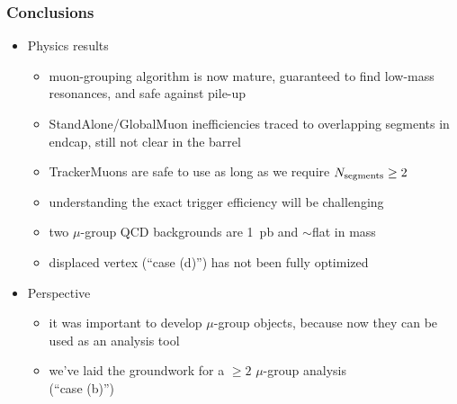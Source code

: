 \documentclass[compress]{beamer}
\newcommand{\s}[1]{{\mbox{\scriptsize #1}}}
\begin{document}
\begin{frame}
\frametitle{Conclusions}
\begin{itemize}\setlength{\itemsep}{0.25 cm}
\item Physics results
\begin{itemize}
\item muon-grouping algorithm is now mature, guaranteed to find low-mass resonances, and safe against pile-up
\item StandAlone/GlobalMuon inefficiencies traced to overlapping segments in endcap, still not clear in the barrel
\item TrackerMuons are safe to use as long as we require $N_\s{segments} \ge 2$
\item understanding the exact trigger efficiency will be challenging
\item two $\mu$-group QCD backgrounds are 1~pb and $\sim$flat in mass
\item displaced vertex (``case (d)'') has not been fully optimized
\end{itemize}

\item Perspective
\begin{itemize}
\item it was important to develop $\mu$-group objects, because now they can be used as an analysis tool
\item we've laid the groundwork for a $\ge 2$ $\mu$-group analysis \\ (``case (b)'')
\end{itemize}
\end{itemize}
\label{numpages}
\end{frame}
\end{document}
